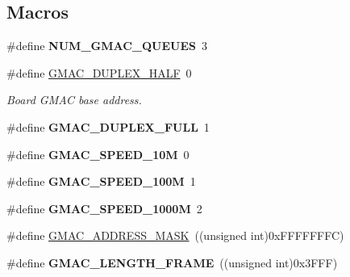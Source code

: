 \subsection*{Macros}
\begin{DoxyCompactItemize}
\item 
\mbox{\label{group__gmac__defines_ga80adb79582f2b934f155be7bb091cb83}} 
\#define {\bfseries N\+U\+M\+\_\+\+G\+M\+A\+C\+\_\+\+Q\+U\+E\+U\+ES}~3
\item 
\mbox{\label{group__gmac__defines_gaec5646fd5306fa88139b1ab86665a798}} 
\#define \mbox{\hyperlink{group__gmac__defines_gaec5646fd5306fa88139b1ab86665a798}{G\+M\+A\+C\+\_\+\+D\+U\+P\+L\+E\+X\+\_\+\+H\+A\+LF}}~0
\begin{DoxyCompactList}\small\item\em Board G\+M\+AC base address. \end{DoxyCompactList}\item 
\mbox{\label{group__gmac__defines_ga08867b145e047811ba33ba47d725c8fd}} 
\#define {\bfseries G\+M\+A\+C\+\_\+\+D\+U\+P\+L\+E\+X\+\_\+\+F\+U\+LL}~1
\item 
\mbox{\label{group__gmac__defines_ga6ff3e2e0b2ea66e6c362ff6918ba54cb}} 
\#define {\bfseries G\+M\+A\+C\+\_\+\+S\+P\+E\+E\+D\+\_\+10M}~0
\item 
\mbox{\label{group__gmac__defines_ga374036099d381df0ddafdacc5377f848}} 
\#define {\bfseries G\+M\+A\+C\+\_\+\+S\+P\+E\+E\+D\+\_\+100M}~1
\item 
\mbox{\label{group__gmac__defines_ga0d9432c707c23845590da78348e9d268}} 
\#define {\bfseries G\+M\+A\+C\+\_\+\+S\+P\+E\+E\+D\+\_\+1000M}~2
\item 
\#define \mbox{\hyperlink{group__gmac__defines_ga206f1c848d30bec082a223d086e7428b}{G\+M\+A\+C\+\_\+\+A\+D\+D\+R\+E\+S\+S\+\_\+\+M\+A\+SK}}~((unsigned int)0x\+F\+F\+F\+F\+F\+F\+F\+C)
\item 
\mbox{\label{group__gmac__defines_gaccdd0c2f0f9dc890ff52d3af8a8c7d9e}} 
\#define {\bfseries G\+M\+A\+C\+\_\+\+L\+E\+N\+G\+T\+H\+\_\+\+F\+R\+A\+ME}~((unsigned int)0x3\+F\+F\+F)
\item 

\end{DoxyCompactItemize}
